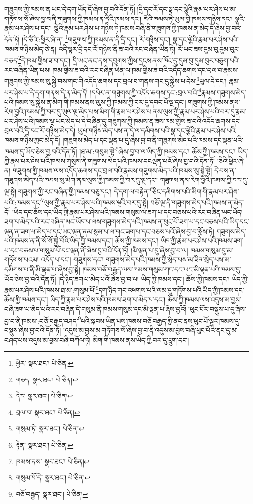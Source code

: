 གཟུགས་ཀྱི་ཁམས་ན་ཡང་དེ་དག་ཡོད་དོ་ཞེས་བྱ་བའི་དོན་ཏོ། །དྲི་དང་རོ་དང་སྣ་དང་ལྕེའི་རྣམ་པར་ཤེས་པ་མ་གཏོགས་སོ་ཞེས་བྱ་བ་ནི་གཟུགས་ཀྱི་ཁམས་ན་དྲིའི་ཁམས་དང་། རོའི་ཁམས་ཏེ་ཡུལ་གྱི་ཁམས་གཉིས་དང་། སྣའི་རྣམ་པར་ཤེས་པ་དང་། ལྕེའི་རྣམ་པར་ཤེས་པ་གཉིས་ཏེ་ཁམས་བཞི་ནི་གཟུགས་ཀྱི་ཁམས་ན་མེད་དོ་ཞེས་བྱ་བའི་དོན་ཏོ། །དེ་ཅིའི་:ཕྱིར་ཞེ་ན། \footnote{ཕྱིར་  སྣར་ཐང་།  པེ་ཅིན། }གཟུགས་ཀྱི་ཁམས་ན་ནི་དྲི་དང་། རོ་གཉིས་དང་། སྣ་དང་ལྕེའི་རྣམ་པར་ཤེས་པའི་ཁམས་གཉིས་མེད་ཅེ་ན། འདི་ལྟར་དྲི་དང་རོ་གཉིས་ནི་ཟ་བའི་རང་བཞིན་ཡིན་ཏེ། རོ་ཡང་ཟས་དུམ་བུ་དུམ་བུར་བཅད་\footnote{གཅད་  སྣར་ཐང་།  པེ་ཅིན། }དེ་ཁམ་གྱིས་ཟ་བ་དང་། དྲི་ཡང་ནང་ནས་དབུགས་ཀྱིས་དྲངས་ནས་ཁོང་དུ་དུམ་བུ་དུམ་བུར་བཅུག་པའི་རང་བཞིན་ཡིན་པས། ཁམ་གྱིས་ཟ་བའི་རང་བཞིན་ཡིན་ལ་ཁམ་གྱིས་ཟ་བའི་འདོད་ཆགས་དང་བྲལ་བ་རྣམས་གཟུགས་ཀྱི་ཁམས་སུ་སྐྱེ་བས་གང་གི་འདོད་ཆགས་དང་བྲལ་བ་གནས་གང་དུ་སྐྱེས་པ་དེས་\footnote{དེར་  སྣར་ཐང་།  པེ་ཅིན། }ཡུལ་དེ་དང་། རྣམ་པར་ཤེས་པ་དེ་དག་གནས་དེ་ན་མེད་དོ། །དཔེར་ན་གཟུགས་ཀྱི་འདོད་ཆགས་དང་:བྲལ་བའི་\footnote{བྲལ་བ་  སྣར་ཐང་།  པེ་ཅིན། }རྣམས་གཟུགས་མེད་པའི་ཁམས་སུ་སྐྱེས་ན་མིག་གི་ཁམས་ནས་ལུས་ཀྱི་ཁམས་ཀྱི་བར་དུ་དབང་པོ་ལྔ་དང་། གཟུགས་ཀྱི་ཁམས་ནས་རེག་བྱའི་ཁམས་ཀྱི་བར་དུ་ཡུལ་ལྔ་མེད་པས་མིག་གི་རྣམ་པར་ཤེས་པ་ནས་ལུས་ཀྱི་རྣམ་པར་ཤེས་པའི་བར་དུ་རྣམ་པར་ཤེས་པའི་ཁམས་ལྔ་ཡང་མེད་པ་དེ་བཞིན་དུ་གཟུགས་ཀྱི་ཁམས་ན་ཟས་ཁམ་གྱིས་ཟ་བའི་འདོད་ཆགས་དང་བྲལ་བའི་དྲི་དང་རོ་གཉིས་མེད་དེ། ཡུལ་གཉིས་མེད་པས་ན་དེ་ལ་དམིགས་པའི་སྣ་དང་ལྕེའི་རྣམ་པར་ཤེས་པའི་ཁམས་གཉིས་ཀྱང་མེད་དོ། །གཟུགས་མེད་པ་དང་ལྡན་པ་དུ་ཞེས་བྱ་བ་ནི་གཟུགས་མེད་པའི་ཁམས་དང་ལྡན་པའི་ཁམས་དུ་ཡོད་ཅེས་བྱ་བའི་དོན་ཏོ། །ཐ་མ་:གསུམ་སྟེ་\footnote{གསུམ་ཏེ་  སྣར་ཐང་།  པེ་ཅིན། }ཞེས་བྱ་བ་ལ་ཡིད་ཀྱི་ཁམས་དང་། ཆོས་ཀྱི་ཁམས་དང་། ཡིད་ཀྱི་རྣམ་པར་ཤེས་པའི་ཁམས་གསུམ་ནི་གཟུགས་མེད་པའི་ཁམས་དང་ལྡན་པའོ་ཞེས་བྱ་བའི་དོན་ཏོ། །ཅིའི་ཕྱིར་ཞེ་ན། གཟུགས་ཀྱི་ཁམས་ལས་འདོད་ཆགས་དང་བྲལ་བའི་རྣམས་གཟུགས་མེད་པའི་ཁམས་སུ་སྐྱེ་སྟེ། དེ་བས་ན་གཟུགས་མེད་པའི་ཁམས་སུ་མིག་ནས་ལུས་ཀྱི་ཁམས་ཀྱི་བར་དུ་ལྔ་དང་། གཟུགས་ནས་རེག་བྱའི་ཁམས་ཀྱི་བར་དུ་ལྔ་སྟེ། གཟུགས་ཀྱི་རང་བཞིན་གྱི་ཁམས་བཅུ་དང་། དེ་དག་ལ་བརྟེན་\footnote{རྟེན་  སྣར་ཐང་།  པེ་ཅིན། }ཅིང་དམིགས་པའི་མིག་གི་རྣམ་པར་ཤེས་པའི་:ཁམས་དང་\footnote{ཁམས་ནས་  སྣར་ཐང་།  པེ་ཅིན། }ལུས་ཀྱི་རྣམ་པར་ཤེས་པའི་ཁམས་ལྔའི་བར་དུ་སྟེ། བཅོ་ལྔ་ནི་གཟུགས་མེད་པའི་ཁམས་ན་མེད་དོ། །ཡིད་དང་ཆོས་དང་ཡིད་ཀྱི་རྣམ་པར་ཤེས་པའི་ཁམས་གསུམ་ལ་ཟག་པ་དང་བཅས་པའི་རང་བཞིན་ཡང་ཡོད། ཟག་པ་མེད་པའི་རང་བཞིན་ཡང་ཡོད་པ་ལས་གཟུགས་མེད་པའི་ཁམས་ན་ཕུང་པོ་ཟག་པ་དང་བཅས་པའི་ཡིད་དང་ལྡན་ན་ཟག་པ་མེད་པ་དང་ཡང་ལྡན་ནམ་སྙམ་པ་ལ་གང་ཟག་པ་དང་བཅས་པའོ་ཞེས་བྱ་བ་སྨོས་ཏེ། གཟུགས་མེད་པའི་ཁམས་ན་ནི་སོ་སོ་སྐྱེ་བོའི་ཡིད་ཀྱི་ཁམས་དང་། ཆོས་ཀྱི་ཁམས་དང་། ཡིད་ཀྱི་རྣམ་པར་ཤེས་པའི་ཁམས་ཟག་པ་དང་བཅས་པ་གསུམ་པོ་དང་ལྡན་ནོ་ཞེས་བྱ་བའི་དོན་ཏོ། །མི་ལྡན་པ་དུ་ཞེས་བྱ་བ་ལ། ཁམས་གསུམ་དུ་མ་གཏོགས་པའམ། འདོད་པ་དང་། གཟུགས་དང་། གཟུགས་མེད་པའི་ཁམས་ཀྱི་སྲེད་པས་མ་ཟིན་སྲེད་པས་མ་དམིགས་པ་ནི་མི་ལྡན་པ་ཞེས་བྱ་སྟེ། ཁམས་བཅོ་བརྒྱད་ལས་ཁམས་གསུམ་གང་དང་ཡང་མི་ལྡན་པའི་ཁམས་དུ་ཡོད་ཅེས་བྱ་བའི་དོན་ཏོ། །དེ་ཉིད་ཟག་པ་མེད་པའོ་ཞེས་བྱ་བ་ལ། ཡིད་ཀྱི་ཁམས་དང་། ཆོས་ཀྱི་ཁམས་དང་། ཡིད་ཀྱི་རྣམ་པར་ཤེས་པའི་ཁམས་ཐ་མ་:གསུམ་པོ་\footnote{གསུམ་པོ་དེ་  སྣར་ཐང་།  པེ་ཅིན། }དག་ཉིད་གང་འཕགས་པའི་ལམ་དུ་གཏོགས་པའི་ཡིད་ཀྱི་ཁམས་དང་ཆོས་ཀྱི་ཁམས་དང་། ཡིད་ཀྱི་རྣམ་པར་ཤེས་པའི་ཁམས་ཟག་པ་མེད་པ་དང་། ཆོས་ཀྱི་ཁམས་ལས་འདུས་མ་བྱས་བཞི་ཟག་པ་མེད་པའི་རང་བཞིན་དེ་གསུམ་ནི་ཁམས་གསུམ་དང་མི་ལྡན་པ་ཞེས་བྱའོ། །ཕུང་པོར་བསྡུས་པ་དུ་ཞེས་བྱ་བ་ནི་ཁམས་:བཅོ་བརྒྱད་བཤད་\footnote{བཅོ་བརྒྱད་  སྣར་ཐང་།  པེ་ཅིན། }པའི་སྐབས་ཡིན་པས་ཁམས་བཅོ་བརྒྱད་ཀྱི་ནང་ནས་ཕུང་པོ་ལྔར་ཁམས་དུ་བསྡུས་ཞེས་བྱ་བའི་དོན་ཏོ། །འདུས་མ་བྱས་མ་གཏོགས་སོ་ཞེས་བྱ་བ་ནི་འདུས་མ་བྱས་བཞི་ཕུང་པོའི་ནང་དུ་མ་བཤད་པས་འདུས་མ་བྱས་བཞི་བཀོལ་ཏེ། མིག་གི་ཁམས་ནས་ཡིད་ཀྱི་བར་དུ་དྲུག་དང་། 